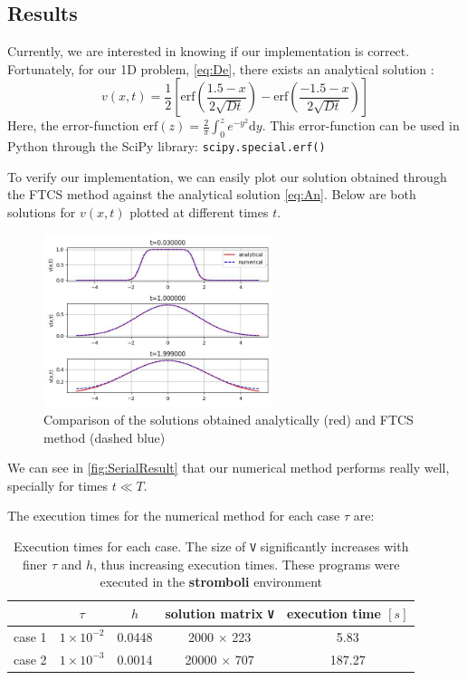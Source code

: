 \subsection{Results}
\label{subsec:results}
Currently, we are interested in knowing if our implementation is correct. Fortunately, for our 1D problem, \autoref{eq:De}, there exists an analytical solution \cite{paper}:
\begin{equation}
    v(x,t) = \dfrac{1}{2}\left[ \text{erf}\left( \dfrac{1.5 - x}{2\sqrt{Dt}} \right) - \text{erf}\left( \dfrac{-1.5 - x}{2\sqrt{Dt}} \right) \right] 
    \label{eq:An}
\end{equation}
Here, the error-function $\text{erf}(z) = \frac{2}{\pi}\int_{0}^{z}e^{-y^2} \text{d}y$. This error-function can be used in Python through the SciPy library: \texttt{scipy.special.erf()}

To verify our implementation, we can easily plot our solution obtained through the FTCS method against the analytical solution \autoref{eq:An}. Below are both solutions for $v(x,t)$ plotted at different times $t$.

\begin{figure}[H]
    \centering
    \includegraphics[width=0.6\textwidth]{figures/serial_plot.jpg}
    \caption{Comparison of the solutions obtained analytically (red) and FTCS method (dashed blue)}
    \label{fig:SerialResult}
\end{figure}

We can see in \autoref{fig:SerialResult} that our numerical method performs really well, specially for times $t \ll T$.

The execution times for the numerical method for each case $\tau$ are:
\begin{table}[H]
    \centering
\begin{tabular}{|c|c|c|c|c|}
    \hline
    & $\tau$ & $h$ &  solution matrix \texttt{V} & execution time $[s]$ \\
    \hline
    case 1 & $1\times10^{-2}$ & 0.0448 & 2000 $\times$ 223 & 5.83 \\
    case 2& $1\times10^{-3}$ & 0.0014 & 20000 $\times$ 707 & 187.27 \\
    \hline
\end{tabular}
\caption{Execution times for each case. The size of \texttt{V} significantly increases with finer $\tau$ and $h$, thus increasing execution times. These programs were executed in the \textbf{stromboli} environment}
\end{table}


